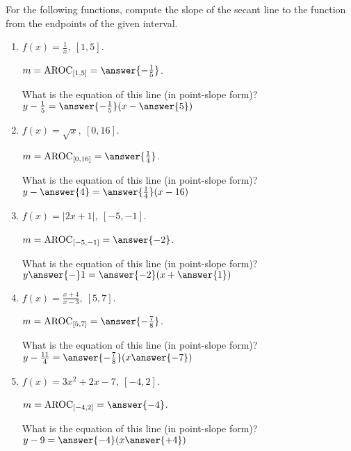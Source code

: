 \documentclass{ximera}
\author{Elizabeth Campolongo}
\begin{document}
\begin{exercise}

For the following functions, compute the slope of the secant line to the function from the endpoints of the given interval.

\begin{enumerate}
\item $f(x)= \frac{1}{x}, \ [1,5]$.

$m = \av_{[1, 5]} = \answer{-\frac{1}{5}}$.  
\begin{exercise}
What is the equation of this line (in point-slope form)?\\
$y-\frac{1}{5} = \answer{-\frac{1}{5}}(x-\answer{5})$
\end{exercise}

\item $f(x)= \sqrt{x}, \ [0,16]$.

$m = \av_{[0, 16]} = \answer{\frac{1}{4}}$.  
\begin{exercise}
What is the equation of this line (in point-slope form)?\\
$y-\answer{4} = \answer{\frac{1}{4}}(x-16)$
\end{exercise}

\item $f(x)= |2x+1|, \ [-5,-1]$.

$m = \av_{[-5,-1]} = \answer{-2}$.  
\begin{exercise}
What is the equation of this line (in point-slope form)?\\
$y\answer{-} 1= \answer{-2}(x+\answer{1})$
\end{exercise}


\item $f(x)= \frac{x+4}{x-3}, \ [5,7]$.

$m = \av_{[5, 7]} = \answer{-\frac{7}{8}}$.  
\begin{exercise}
What is the equation of this line (in point-slope form)?\\
$y-\frac{11}{4} = \answer{-\frac{7}{8}}(x\answer{-7})$
\end{exercise}

\item $f(x)= 3x^2 +2x-7, \ [-4,2]$.

$m = \av_{[-4, 2]} = \answer{-4}$.  
\begin{exercise}
What is the equation of this line (in point-slope form)?\\
$y-9 = \answer{-4}(x \answer{+4})$
\end{exercise}
	
\end{enumerate}

\end{exercise}
\end{document}
